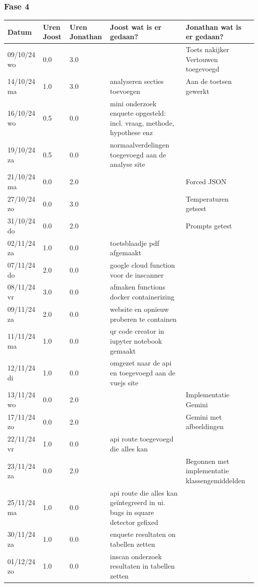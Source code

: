 \documentclass[12pt]{article}
\begin{document}
\subsubsection*{Fase 4}
\footnotesize
\begin{longtable}{@{}p{2.5cm} p{1cm} p{1.5cm} p{5cm} p{5cm}}
Datum  & Uren Joost & Uren Jonathan & Joost wat is er gedaan? & Jonathan wat is er gedaan? \\
\midrule
\endhead
09/10/24 wo & 0.0 & 3.0 &  & Toets nakijker Vertouwen toegevoegd  \\
14/10/24 ma & 1.0 & 3.0 & analyseren secties toevoegen & Aan de toetsen gewerkt \\
16/10/24 wo & 0.5 & 0.0 & mini onderzoek enquete opgesteld: incl. vraag, methode, hypothese enz &  \\
19/10/24 za & 0.5 & 0.0 & normaalverdelingen toegevoegd aan de analyse site &  \\
21/10/24 ma & 0.0 & 2.0 &  & Forced JSON \\
27/10/24 zo & 0.0 & 3.0 &  & Temperaturen getsest \\
31/10/24 do & 0.0 & 2.0 &  & Prompts getest \\
02/11/24 za & 1.0 & 0.0 & toetsblaadje pdf afgemaakt &  \\
07/11/24 do & 2.0 & 0.0 & google cloud function voor de inscanner &  \\
08/11/24 vr & 3.0 & 0.0 & afmaken functions docker containerizing &  \\
09/11/24 za & 2.0 & 0.0 & website en opnieuw proberen te containen &  \\
11/11/24 ma & 1.0 & 0.0 & qr code creator in iupyter notebook gemaakt &  \\
12/11/24 di & 1.0 & 0.0 & omgezet naar de api en toegevoegd aan de vuejs site &  \\
13/11/24 wo & 0.0 & 2.0 &  & Implementatie Gemini \\
17/11/24 zo & 0.0 & 2.0 &  & Gemini met afbeeldingen \\
22/11/24 vr & 1.0 & 0.0 & api route toegevoegd die alles kan &  \\
23/11/24 za & 0.0 & 2.0 &  & Begonnen met implementatie klassengemiddelden \\
25/11/24 ma & 1.0 & 0.0 & api route die alles kan geïntegreerd in ui. bugs in square detector gefixed &  \\
30/11/24 za & 1.0 & 0.0 & enquete resultaten on tabellen zetten &  \\
01/12/24 zo & 1.0 & 0.0 & inscan onderzoek resultaten in tabellen zetten &  \\

\end{longtable}
\end{document}

